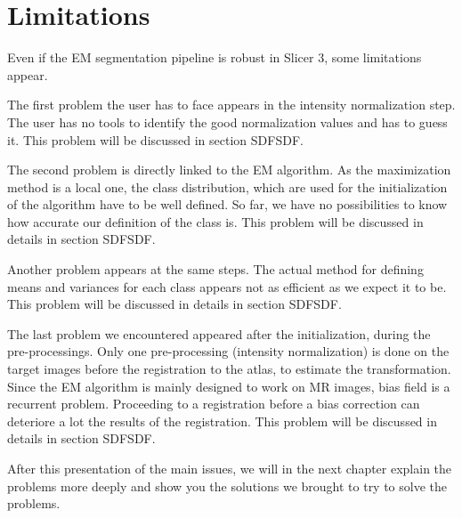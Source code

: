 \section{Limitations}
Even if the EM segmentation pipeline is robust in Slicer 3, some limitations appear.
\par
The first problem the user has to face appears in the intensity normalization step. The user has no tools to identify the good normalization values and has to guess it. This problem will be discussed in section SDFSDF.
\par
The second problem is directly linked to the EM algorithm. As the maximization method is a local one, the class distribution, which are used for the initialization of the algorithm have to be well defined. So far, we have no possibilities to know how accurate our definition of the class is. This problem will be discussed in details in section SDFSDF.
\par
Another problem appears at the same steps. The actual method for defining means and variances for each class appears not as efficient as we expect it to be. This problem will be discussed in details in section SDFSDF.
\par 
The last problem we encountered appeared after the initialization, during the pre-processings. Only one pre-processing (intensity normalization) is done on the target images before the registration to the atlas, to estimate the transformation. Since the EM algorithm is mainly designed to work on MR images, bias field is a recurrent problem. Proceeding to a registration before a bias correction can deteriore a lot the results of the registration. This problem will be discussed in details in section SDFSDF.\\

%
\par
After this presentation of the main issues, we will in the next chapter explain the problems more deeply and show you the solutions we brought to try to solve the problems.
